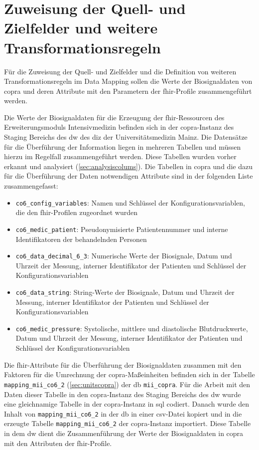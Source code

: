 \section{Zuweisung der Quell- und Zielfelder und weitere Transformationsregeln} \label{sec:transfer}

Für die Zuweisung der Quell- und Zielfelder und die Definition von weiteren Transformationsregeln im Data Mapping sollen die Werte der Biosignaldaten von \ac{copra} und deren Attribute mit den Parametern der \ac{fhir}-Profile zusammengeführt werden.

Die Werte der Biosignaldaten für die Erzeugung der \ac{fhir}-Ressourcen des Erweiterungsmoduls \glqq Intensivmedizin\grqq{} befinden sich in der \ac{copra}-Instanz des Staging Bereichs des \ac{dw} des \ac{diz} der Universitätsmedizin Mainz. Die Datensätze für die Überführung der Information liegen in mehreren Tabellen und müssen hierzu im Regelfall zusammengeführt werden. Diese Tabellen wurden vorher erkannt und analysiert (\ref{sec:analysiscolums}). Die Tabellen in \ac{copra} und die dazu für die Überführung der Daten notwendigen Attribute sind in der folgenden Liste zusammengefasst:
\begin{itemize}
  \item \texttt{co6\_config\_variables}: Namen und Schlüssel der Konfigurationsvariablen, die den \ac{fhir}-Profilen zugeordnet wurden
  \item \texttt{co6\_medic\_patient}: Pseudonymisierte Patientennummer und interne Identifikatoren der behandelnden Personen
  \item \texttt{co6\_data\_decimal\_6\_3}: Numerische Werte der Biosignale, Datum und Uhrzeit der Messung, interner Identifikator der Patienten und Schlüssel der Konfigurationsvariablen
  \item \texttt{co6\_data\_string}: String-Werte der Biosignale, Datum und Uhrzeit der Messung, interner Identifikator der Patienten und Schlüssel der Konfigurationsvariablen
  \item \texttt{co6\_medic\_pressure}: Systolische, mittlere und diastolische Blutdruckwerte, Datum und Uhrzeit der Messung, interner Identifikator der Patienten und Schlüssel der Konfigurationsvariablen
\end{itemize}

Die \ac{fhir}-Attribute für die Überführung der Biosignaldaten zusammen mit den Faktoren für die Umrechnung der \ac{copra}-Maßeinheiten befinden sich in der Tabelle \texttt{mapping\_mii\_co6\_2} (\ref{sec:unitscopra}) der \ac{db} \texttt{mii\_copra}. Für die Arbeit mit den Daten dieser Tabelle in den \ac{copra}-Instanz des Staging Bereichs des \ac{dw} wurde eine gleichnamige Tabelle in der \ac{copra}-Instanz in \ac{sql} codiert. Danach wurde den Inhalt von \texttt{mapping\_mii\_co6\_2} in der \ac{db} in einer \ac{csv}-Datei kopiert und in die erzeugte Tabelle \texttt{mapping\_mii\_co6\_2} der \ac{copra}-Instanz importiert. Diese Tabelle in dem \ac{dw} dient die Zusammenführung der Werte der Biosignaldaten in \ac{copra} mit den Attributen der \ac{fhir}-Profile.

